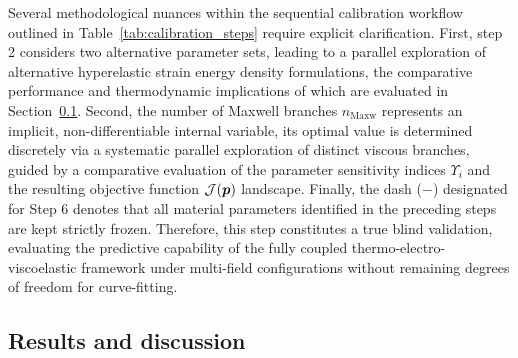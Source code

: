 


Several methodological nuances within the sequential calibration workflow outlined in Table~\ref{tab:calibration_steps} require explicit clarification. First, step 2 considers two alternative parameter sets, leading to a parallel exploration of alternative hyperelastic strain energy density formulations, the comparative performance and thermodynamic implications of which are evaluated in Section~\ref{sec:experim_results}. Second, the number of Maxwell branches $n_\text{Maxw}$ represents an implicit, non-differentiable internal variable, its optimal value is determined discretely via a systematic parallel exploration of distinct viscous branches, guided by a comparative evaluation of the parameter sensitivity indices $\Upsilon_i$ and the resulting objective function $\mathcal{J}(\boldsymbol{p})$ landscape. Finally, the dash ($-$) designated for Step 6 denotes that all material parameters identified in the preceding steps are kept strictly frozen. Therefore, this step constitutes a true blind validation, evaluating the predictive capability of the fully coupled thermo-electro-viscoelastic framework under multi-field configurations without remaining degrees of freedom for curve-fitting.



\subsection{Results and discussion}
\label{sec:experim_results}


